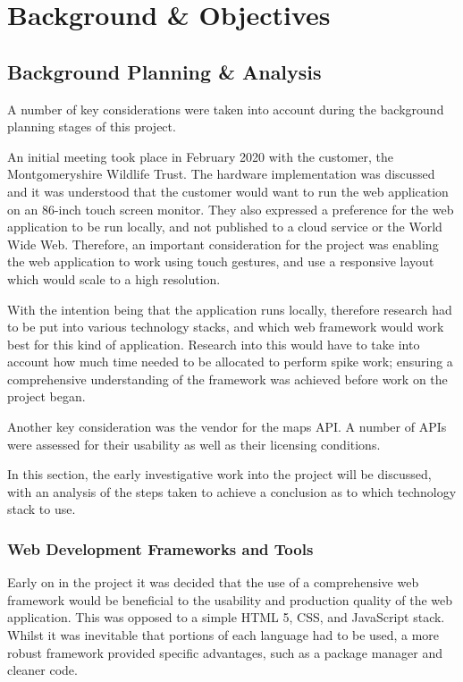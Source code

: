 \chapter{Background \& Objectives}

\section{Background Planning \& Analysis}

A number of key considerations were taken into account during the background planning stages of this project.

An initial meeting took place in February 2020 with the customer, the Montgomeryshire Wildlife Trust. The hardware implementation was discussed and it was understood that the customer would want to run the web application on an 86-inch touch screen monitor. They also expressed a preference for the web application to be run locally, and not published to a cloud service or the World Wide Web. Therefore, an important consideration for the project was enabling the web application to work using touch gestures, and use a responsive layout which would scale to a high resolution.

With the intention being that the application runs locally, therefore research had to be put into various technology stacks, and which web framework would work best for this kind of application. Research into this would have to take into account how much time needed to be allocated to perform spike work; ensuring a comprehensive understanding of the framework was achieved before work on the project began.

Another key consideration was the vendor for the maps API. A number of APIs were assessed for their usability as well as their licensing conditions.

In this section, the early investigative work into the project will be discussed, with an analysis of the steps taken to achieve a conclusion as to which technology stack to use. 

\subsection{Web Development Frameworks and Tools}

Early on in the project it was decided that the use of a comprehensive web framework would be beneficial to the usability and production quality of the web application. This was opposed to a simple HTML 5, CSS, and JavaScript stack. Whilst it was inevitable that portions of each language had to be used, a more robust framework provided specific advantages, such as a package manager and cleaner code.

